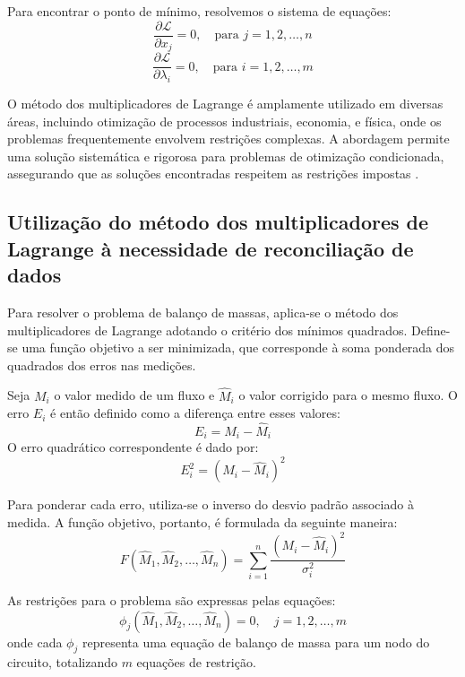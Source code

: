 Para encontrar o ponto de mínimo, resolvemos o sistema de equações:
\begin{equation}
\frac{\partial \mathcal{L}}{\partial x_j} = 0, \quad \text{para } j = 1, 2, \dots, n
\label{eq:partial_xj}
\end{equation}
\begin{equation}
\frac{\partial \mathcal{L}}{\partial \lambda_i} = 0, \quad \text{para } i = 1, 2, \dots, m
\label{eq:partial_lambda_i}
\end{equation}

O método dos multiplicadores de Lagrange é amplamente utilizado em diversas áreas, incluindo otimização de processos industriais, economia, e física, onde os problemas frequentemente envolvem restrições complexas. A abordagem permite uma solução sistemática e rigorosa para problemas de otimização condicionada, assegurando que as soluções encontradas respeitem as restrições impostas \cite{lagrangeoptbook}.

\subsection{Utilização do método dos multiplicadores de Lagrange à necessidade de reconciliação de dados}

Para resolver o problema de balanço de massas, aplica-se o método dos multiplicadores de Lagrange adotando o critério dos mínimos quadrados. Define-se uma função objetivo a ser minimizada, que corresponde à soma ponderada dos quadrados dos erros nas medições.

Seja $M_i$ o valor medido de um fluxo e $\hat{M}_i$ o valor corrigido para o mesmo fluxo. O erro $E_i$ é então definido como a diferença entre esses valores:
\begin{equation}
E_i = M_i - \hat{M}_i
\end{equation}
O erro quadrático correspondente é dado por:
\begin{equation}
E_i^2 = (M_i - \hat{M}_i)^2
\end{equation}

Para ponderar cada erro, utiliza-se o inverso do desvio padrão associado à medida. A função objetivo, portanto, é formulada da seguinte maneira:
\begin{equation}
F(\hat{M}_1, \hat{M}_2, \dots, \hat{M}_n) = \sum_{i=1}^n \frac{(M_i - \hat{M}_i)^2}{\sigma_i^2}
\end{equation}

As restrições para o problema são expressas pelas equações:
\begin{equation}
\phi_j(\hat{M}_1, \hat{M}_2, \dots, \hat{M}_n) = 0, \quad j = 1, 2, \dots, m
\end{equation}
onde cada $\phi_j$ representa uma equação de balanço de massa para um nodo do circuito, totalizando $m$ equações de restrição.

